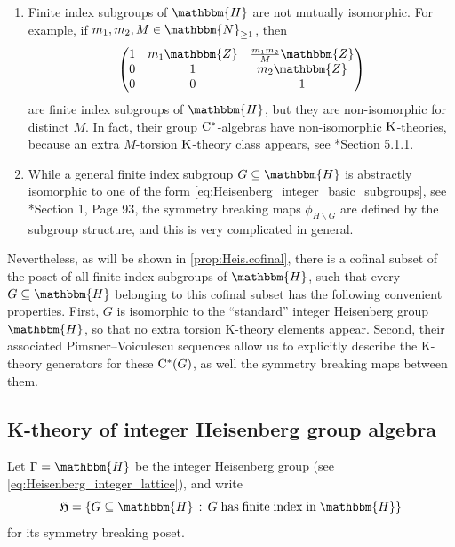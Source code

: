 \documentclass{amsart}
\numberwithin{figure}{section}
\numberwithin{equation}{section}
\numberwithin{table}{section}
\theoremstyle{plain}
\theoremstyle{definition}
\theoremstyle{remark}
\theoremstyle{nonumber}
\newcommand{\N}{\mathbb{N}}
\newcommand{\Z}{\mathbb{Z}}
\newcommand{\HH}{\mathbb{H}} %
\newcommand{\K}{\relax\ifmmode\operatorname{K}\else\textup{K}\fi}
\newcommand{\Cst}{\relax\ifmmode\mathrm{C}^*\else\textup{C*}\fi}
\renewcommand{\mathbb}{\mathbbm} %
\begin{document}
\begin{enumerate}
\item Finite index subgroups of $\HH$ are not mutually isomorphic. For example, if $m_1,m_2,M\in\N_{\geq 1}$, then
\begin{equation}\label{eq:Heisenberg_integer_basic_subgroups}
\begin{pmatrix}1 & m_1\Z & \frac{m_1m_2}{M}\Z \\ 0 & 1 & m_2\Z \\ 0 & 0 & 1\end{pmatrix}
\end{equation}
are finite index subgroups of $\HH$, but they are non-isomorphic for
distinct $M$. In fact, their group $\Cst$-algebras have non-isomorphic
$\K$-theories, because an extra $M$-torsion $\K$-theory
class appears, see
\cite{Hannabuss-Mathai-Thiang:T-duality_parametrised}*{Section 5.1.1}.

\item While a general finite index subgroup $G\subseteq \HH$ is abstractly isomorphic to one of the form \eqref{eq:Heisenberg_integer_basic_subgroups}, see
\cite{Lee-Packer:Twisted_group_Cst-algebras}*{Section 1, Page 93}, the symmetry breaking maps
$\phi_{H\backslash G}$ are defined by the subgroup structure, and this is very complicated in general.
\end{enumerate}

Nevertheless, as will be shown in \cref{prop:Heis.cofinal}, there is a
cofinal subset of the poset of all finite-index subgroups of \( \HH \),
such that every  \( G\subseteq \HH \) belonging to this cofinal
subset has the following convenient properties.
First, \( G \) is isomorphic to
the ``standard'' integer Heisenberg group $\HH$, so that no extra torsion
K-theory elements appear. Second, their associated Pimsner--Voiculescu
sequences
allow us to explicitly describe the K-theory generators for these \( \Cst(G)
\),
as well the symmetry breaking maps between them.

\subsection{K-theory of integer Heisenberg group algebra}

Let $\Gamma=\HH$ be the integer Heisenberg group 
(see \eqref{eq:Heisenberg_integer_lattice}), and write
\[
\mathfrak{H}=\{G\subseteq \HH\,:\,G\;\text{has\;finite\;index\;in}\;\HH\}
\]
for its symmetry breaking poset. 
\end{document}
